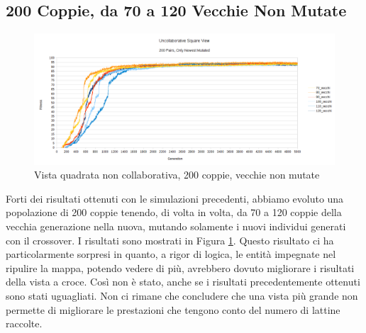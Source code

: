 \subsection{200 Coppie, da 70 a 120 Vecchie Non Mutate}
\begin{figure}[ht]
	\centering
	\includegraphics[scale=0.7,angle=90]{imgs/uncollaborative_square_200_pairs_70_120_vecchi_solo_nuovi_mutati.png}
	\caption{Vista quadrata non collaborativa, 200 coppie, vecchie non mutate}
	\label{figure:uncoll_square_200_70_120_vecchi_non_mutati}
\end{figure}
Forti dei risultati ottenuti con le simulazioni precedenti, abbiamo evoluto una
popolazione di 200 coppie tenendo, di volta in volta, da 70 a 120 coppie della
vecchia generazione nella nuova, mutando solamente i nuovi individui generati
con il crossover.\newline
I risultati sono mostrati in Figura
\ref{figure:uncoll_square_200_70_120_vecchi_non_mutati}. Questo risultato ci ha
particolarmente sorpresi in quanto, a rigor di logica, le entità impegnate nel
ripulire la mappa, potendo vedere di più, avrebbero dovuto migliorare i
risultati della vista a croce. Così non è stato, anche se i risultati
precedentemente ottenuti sono stati uguagliati. Non ci rimane che concludere
che una vista più grande non permette di migliorare le prestazioni che tengono
conto del numero di lattine raccolte.



\clearpage



